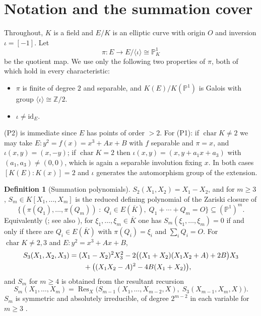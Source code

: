 \documentclass[11pt,a4paper]{article}
\theoremstyle{plain}
\theoremstyle{definition}
\newtheorem{definition}[theorem]{Definition}
\DeclareMathOperator{\Res}{Res}
\newcommand{\PP}{\mathbb{P}}
\newcommand{\ZZ}{\mathbb{Z}}
\begin{document}
\section{Notation and the summation cover}\label{sec:setup}

Throughout, $K$ is a field and $E/K$ is an elliptic curve with origin $O$ and
inversion $\iota = [-1]$. Let
\[
  \pi \colon E \longrightarrow E/\langle\iota\rangle \cong \PP^1_K
\]
be the quotient map. We use only the following two properties of $\pi$, both of
which hold in every characteristic:

\begin{itemize}
\item[(P1)] $\pi$ is finite of degree $2$ and separable, and
  $K(E)/K(\PP^1)$ is Galois with group $\langle \iota \rangle \cong \ZZ/2$.
\item[(P2)] $\iota \neq \mathrm{id}_E$.
\end{itemize}

(P2) is immediate since $E$ has points of order $>2$. For (P1): if
$\operatorname{char} K \neq 2$ we may take $E : y^2 = f(x) = x^3 + Ax + B$ with
$f$ separable and $\pi = x$, and $\iota(x,y) = (x,-y)$; if
$\operatorname{char} K = 2$ then $\iota(x,y) = (x, y + a_1 x + a_3)$ with
$(a_1,a_3) \neq (0,0)$, which is again a separable involution fixing $x$. In both
cases $[K(E):K(x)] = 2$ and $\iota$ generates the automorphism group of the
extension.

\begin{definition}[Summation polynomials]\label{def:sm}
$S_2(X_1,X_2) = X_1 - X_2$, and for $m \ge 3$, $S_m \in K[X_1,\dots,X_m]$ is the
reduced defining polynomial of the Zariski closure of
\[
  \bigl\{ (\pi(Q_1),\dots,\pi(Q_m)) \;:\; Q_i \in E(\overline{K}),\;
      Q_1 + \cdots + Q_m = O \bigr\} \subseteq (\PP^1)^m .
\]
Equivalently (\cite{semaev2004}; see also \cite[Prop.~2.1]{ky2015}), for
$\xi_1,\dots,\xi_m \in \overline{K}$ one has $S_m(\xi_1,\dots,\xi_m) = 0$ if and
only if there are $Q_i \in E(\overline{K})$ with $\pi(Q_i) = \xi_i$ and
$\sum_i Q_i = O$. For $\operatorname{char} K \neq 2,3$ and
$E : y^2 = x^3 + Ax + B$,
\begin{align}
  S_3(X_1,X_2,X_3) &= (X_1-X_2)^2 X_3^2
     - 2\bigl((X_1+X_2)(X_1X_2+A) + 2B\bigr) X_3 \notag \\
   &\qquad + \bigl( (X_1X_2 - A)^2 - 4B(X_1+X_2) \bigr),
   \label{eq:s3}
\end{align}
and $S_m$ for $m \ge 4$ is obtained from the resultant recursion
\begin{equation}\label{eq:recursion}
  S_m(X_1,\dots,X_m) =
  \Res_X\bigl( S_{m-1}(X_1,\dots,X_{m-2},X),\; S_3(X_{m-1},X_m,X) \bigr).
\end{equation}
$S_m$ is symmetric and absolutely irreducible, of degree $2^{m-2}$ in each
variable for $m \ge 3$ \cite{semaev2004,gaudry2009}.
\end{definition}
\end{document}
